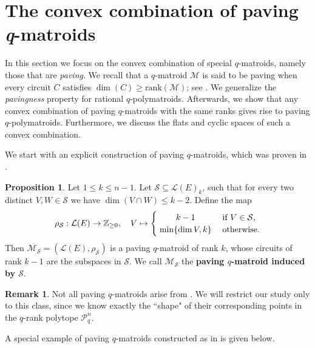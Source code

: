 \documentclass[a4paper,11pt,reqno]{amsart}
\theoremstyle{definition}
\newtheorem{remark}[theorem]{{{Remark}}}
\newtheorem{proposition}[theorem]{{{Proposition}}}
\newcommand{\mM}{\mathcal{M}}
\newcommand{\mL}{\mathcal{L}}
\newcommand{\mS}{\mathcal{S}}
\newcommand{\RP}{\mathcal{P}_q^n}
\begin{document}
{%
\section{The convex combination of paving \emph{q}-matroids}\label{sec: paving_conx_comb}

In this section we focus on the convex combination of special $q$-matroids, namely those that are \emph{paving}. We recall that a $q$-matroid $\mM$ is said to be paving when every circuit $C$ satisfies $\dim(C)\geq\text{rank}(\mM)$; see \cite{luerssen2023representabilitydirectsum}. We generalize the \emph{pavingness} property for rational $q$-polymatroids. Afterwards, we show that any convex combination of paving $q$-matroids with the same ranks gives rise to paving $q$-polymatroids. Furthermore, we discuss the flats and cyclic spaces of such a convex combination.

We start with an explicit construction of paving $q$-matroids, which was proven in \cite{gluesing2022q}.

\begin{proposition}\cite[Prop. 4.6.]{gluesing2022q}\label{prop: paving_construction}
    Let $1\leq k\leq n-1$. Let $\mathcal{S}\subseteq\mL(E)_{k}$, such that for every two distinct $V,W\in\mathcal{S}$ we have $\dim(V\cap W)\leq k-2$. Define the map
    \[        \rho_\mS:\mL(E)\rightarrow\mathbb{Z}_{\geq 0},\quad V\mapsto
        \begin{cases}
            \;\hfil k-1\;&\text{if }V\in\mathcal{S},\\
            \;\hfil \min\{\dim V,k\}\;&\text{otherwise}. 
        \end{cases}
    \]
    Then $\mM_\mS=(\mL(E),\rho_\mS)$ is a paving $q$-matroid of rank $k$, whose circuits of rank $k-1$ are the subspaces in $\mathcal{S}$. We call $\mM_\mS$ the \textbf{paving $q$-matroid induced by $\mS$}.
\end{proposition}

\begin{remark}
    Not all paving $q$-matroids arise  from . We will restrict our study only to this class, since we know exactly the ``shape" of their corresponding points in the $q$-rank polytope $\RP$.
\end{remark}

A special example of paving $q$-matroids constructed as in  is given below.

}
\end{document}
